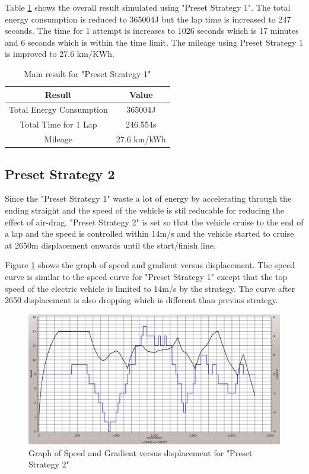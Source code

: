 Table \ref{tb:preset1Result} shows the overall result simulated using "Preset Strategy 1". The total energy consumption is reduced to 365004J but the lap time is increased to 247 seconds. The time for 1 attempt is increases to 1026 seconds which is 17 minutes and 6 seconds which is within the time limit. The mileage using Preset Strategy 1 is improved to 27.6 km/KWh.

\begin{table}[htbp]
\begin{center}
\begin{tabular}{|c|c|}
\hline
\textbf{Result} & \textbf{Value} \\ \hline
Total Energy Consumption & 365004J \\ \hline
Total Time for 1 Lap & 246.554s \\ \hline
Mileage & 27.6 km/kWh \\ \hline
\end{tabular}
\end{center}
\caption{Main result for "Preset Strategy 1" }
\label{tb:preset1Result}
\end{table} \clearpage

\subsection{Preset Strategy 2}
Since the "Preset Strategy 1" waste a lot of energy by accelerating through the ending straight and the speed of the vehicle is stil reducable for reducing the effect of air-drag, "Preset Strategy 2" is set so that the vehicle cruise to the end of a lap and the speed is controlled within 14m/s and the vehicle started to cruise at 2650m displacement onwards until the start/finish line.

Figure \ref{im:2_1} shows the graph of speed and gradient versus displacement. The speed curve is similar to the speed curve for "Preset Strategy 1" except that the top speed of the electric vehicle is limited to 14m/s by the strategy. The curve after 2650 displacement is also dropping which is different than previus strategy. 

\begin{figure}[htb]
	\centering
	\includegraphics[width=6in]{images/2_1.jpg}
	\caption{Graph of Speed and Gradient versus displacement for "Preset Strategy 2"}
	\label{im:2_1}
\end{figure}

